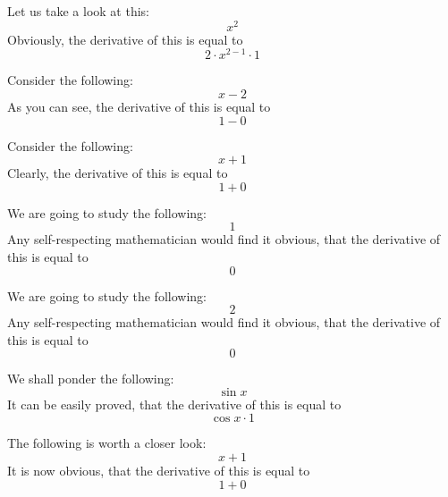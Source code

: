 \documentclass{article}
\begin{document}
Let us take a look at this:
\begin{equation}
x ^{2 } 
\end{equation}
Obviously, the derivative of this is equal to
\begin{equation}
2 \cdot x ^{2 - 1 } \cdot 1 
\end{equation}

Consider the following:
\begin{equation}
x - 2 
\end{equation}
As you can see, the derivative of this is equal to
\begin{equation}
1 - 0 
\end{equation}

Consider the following:
\begin{equation}
x + 1 
\end{equation}
Clearly, the derivative of this is equal to
\begin{equation}
1 + 0 
\end{equation}

We are going to study the following:
\begin{equation}
1 
\end{equation}
Any self-respecting mathematician would find it obvious, that the derivative of this is equal to
\begin{equation}
0 
\end{equation}

We are going to study the following:
\begin{equation}
2 
\end{equation}
Any self-respecting mathematician would find it obvious, that the derivative of this is equal to
\begin{equation}
0 
\end{equation}

We shall ponder the following:
\begin{equation}
\sin x 
\end{equation}
It can be easily proved, that the derivative of this is equal to
\begin{equation}
\cos x \cdot 1 
\end{equation}

The following is worth a closer look:
\begin{equation}
x + 1 
\end{equation}
It is now obvious, that the derivative of this is equal to
\begin{equation}
1 + 0 
\end{equation}
\end{document}
